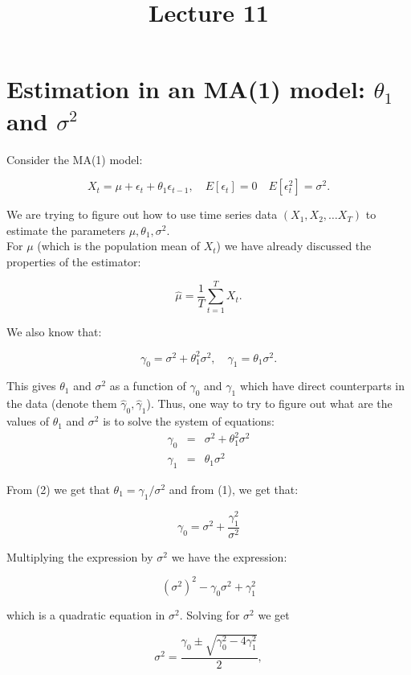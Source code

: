 \documentclass[12] {article}
\begin{document}
\onehalfspace

\title{Lecture 11}
\date{}
\maketitle

\section{Estimation in an MA(1) model: $\theta_1$ and $\sigma^2$}

Consider the MA(1) model:

\[ X_t =  \mu + \epsilon_{t} + \theta_1 \epsilon_{t-1}, \quad E[\epsilon_t]=0 \quad E[\epsilon_t^2]=\sigma^2. \]

\noindent We are trying to figure out how to use time series data $(X_1, X_2, \ldots X_{T})$ to estimate the parameters $\mu, \theta_1, \sigma^2$. \\

For $\mu$ (which is the population mean of $X_t$) we have already discussed the properties of the estimator: 

\[ \widehat{\mu} = \frac{1}{T} \sum_{t=1}^{T} X_t. \]

\noindent We also know that:

\[\gamma_0 = \sigma^2 + \theta_1^2 \sigma^2, \quad \gamma_1 = \theta_1 \sigma^2. \]

This gives $\theta_1$ and $\sigma^2$ as a function of  $\gamma_0$ and $\gamma_1$ which have direct counterparts in the data (denote them $\widehat{\gamma}_0, \widehat{\gamma}_1$). Thus, one way to try to figure out what are the values of $\theta_1$ and $\sigma^2$ is to solve the system of equations:
\begin{eqnarray}
\gamma_0 &=&  \sigma^2 + \theta_1^2 \sigma^2 \\
\gamma_1 &=& \theta_1 \sigma^2  
\end{eqnarray}

\noindent  From (2) we get that $\theta_1 = \gamma_1/\sigma^2$ and from (1), we get that:
 
\[ \gamma_0 =  \sigma^2 + \frac{\gamma_1^2}{\sigma^2} \]

\noindent Multiplying the expression by $\sigma^2$ we have the expression:

\[ (\sigma^2)^2 -\gamma_0 \sigma^2 +  \gamma_1^2 \]

\noindent which is a quadratic equation in $\sigma^2$. Solving for $\sigma^2$ we get 

\[\sigma^2 = \frac{\gamma_0 \pm \sqrt{\gamma_0^2 - 4 \gamma_1^2}}{2},\]
\end{document}

